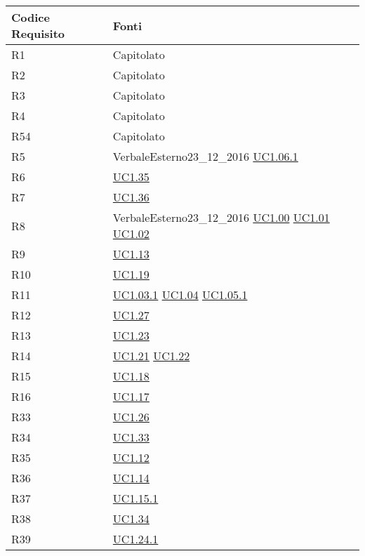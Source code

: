 \begin{longtable}{|P{6cm}|P{6cm}|}
	\hline \textbf{Codice Requisito} & \textbf{Fonti}\\
	\hline R1 & Capitolato \\
	\hline R2 & Capitolato \\
	\hline R3 & Capitolato \\
	\hline R4 & Capitolato \\
	\hline R54 & Capitolato \\
	\hline R5 & VerbaleEsterno23\_12\_2016 \linebreak \hyperref[UC1.06.1]{UC1.06.1}  \\	
	\hline R6 & \hyperref[UC1.35]{UC1.35} \\
	\hline R7 & \hyperref[UC1.36]{UC1.36} \\
	\hline R8 & VerbaleEsterno23\_12\_2016 \linebreak \hyperref[UC1.00]{UC1.00} \linebreak \hyperref[UC1.01]{UC1.01} \linebreak \hyperref[UC1.02]{UC1.02} \\
	\hline R9 & \hyperref[UC1.13]{UC1.13} \\
	\hline R10 & \hyperref[UC1.19]{UC1.19} \\
	\hline R11 & \hyperref[UC1.03.1]{UC1.03.1} \linebreak \hyperref[UC1.04]{UC1.04} \linebreak \hyperref[UC1.05.1]{UC1.05.1} \\
	\hline R12 & \hyperref[UC1.27]{UC1.27} \\
	\hline R13 & \hyperref[UC1.23]{UC1.23} \\
	\hline R14 & \hyperref[UC1.21]{UC1.21} \linebreak \hyperref[UC1.22]{UC1.22} \\
	\hline R15 & \hyperref[UC1.18]{UC1.18} \\
	\hline R16 & \hyperref[UC1.17]{UC1.17} \\
	\hline R33 & \hyperref[UC1.26]{UC1.26} \\
	\hline R34 & \hyperref[UC1.33]{UC1.33} \\
	\hline R35 & \hyperref[UC1.12]{UC1.12} \\
	\hline R36 & \hyperref[UC1.14]{UC1.14} \\
	\hline R37 & \hyperref[UC1.15.1]{UC1.15.1} \\
	\hline R38 & \hyperref[UC1.34]{UC1.34} \\
	\hline R39 & \hyperref[UC1.24.1]{UC1.24.1} \\

\end{longtable}
